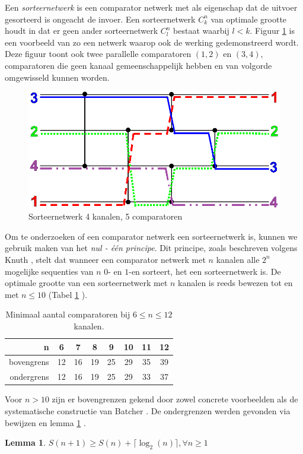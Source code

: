 \documentclass{article}
\newtheorem{lemma}{Lemma}
\begin{document}
Een \textit{sorteernetwerk} is een comparator netwerk met als eigenschap dat de uitvoer gesorteerd is ongeacht de invoer.
Een sorteernetwerk $C^n_k$ van optimale grootte houdt in dat er geen ander sorteernetwerk $C^n_l$ bestaat waarbij $l < k$. %
Figuur \ref{Werking} is een voorbeeld van zo een netwerk waarop ook de werking gedemonstreerd wordt.
Deze figuur toont ook twee parallelle comparatoren $(1,2)$ en $(3,4)$, comparatoren die geen kanaal gemeenschappelijk hebben en van volgorde omgewisseld kunnen worden.
\begin{figure}[h!]
	\centering
	\includegraphics[scale=0.275]{NetworkTransparent.png} 
	\caption{Sorteernetwerk 4 kanalen, 5 comparatoren}
	\label{Werking}
\end{figure}
Om te onderzoeken of een comparator netwerk een sorteernetwerk is, kunnen we gebruik maken van het \textit{nul - \'e\'en principe}. 
Dit principe, zoals beschreven volgens Knuth \cite{Knuth3}, stelt dat wanneer een comparator netwerk met $n$ kanalen alle $2^n$ mogelijke sequenties van $n$ $0$- en $1$-en sorteert, het een sorteernetwerk is.
De optimale grootte van een sorteernetwerk met $n$ kanalen is reeds bewezen tot en met $n \leq 10$ (Tabel \ref{tabel1} \cite{sortingNetworksSize2014}).
\begin{table}[h!]
	\centering
	\begin{tabular}{r|c|c|c|c|c|c|c}
	n & 6 & 7 & 8 & 9 & 10 & 11 & 12\\ 
	\hline 
	bovengrens & 12 & 16 & 19 & 25 & 29 & 35 & 39\\ 
	\hline 
	ondergrens & 12 & 16 & 19 & 25& 29 & 33 & 37\\
	\end{tabular} 
	\caption{Minimaal aantal comparatoren bij $6 \leq n \leq 12$ kanalen.}
	\label{tabel1}
\end{table}
Voor $n > 10$ zijn er bovengrenzen gekend door zowel concrete voorbeelden als de systematische constructie van Batcher \cite{sortingNetworksApplications}. 
De ondergrenzen werden gevonden via bewijzen en lemma \ref{lemma1} \cite{Voorhis1972}.
\begin{lemma}
	$S(n+1) \geq S(n) + \lceil \log_2(n) \rceil, \forall n \geq 1$
	\label{lemma1}
\end{lemma}
\end{document}
